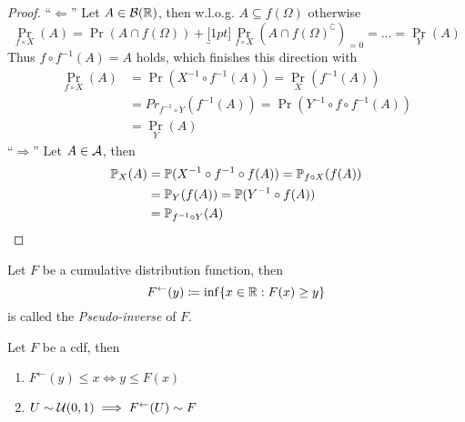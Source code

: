 \begin{proof}
    ``\(\Leftarrow\)'' Let \(A\in\cB(\R)\), then w.l.o.g. \(A\subseteq f(\Omega)\) otherwise
    \[
        \Pr_{f\circ X}(A)=\Pr(A\cap f(\Omega))+\underbracket[1pt]{
            \Pr_{f\circ X}(A\cap f(\Omega)^\complement)
            }_{=0}=\dotsc=\Pr_Y(A) 
    \]
    Thus \(f\circ f^{-1}(A)=A\) holds, which finishes this direction with
    \begin{align*}
        \Pr_{f\circ X}(A)
        &=\Pr(X^{-1}\circ f^{-1}(A))=\Pr_X(f^{-1}(A))\\
        &=Pr_{f^{-1}\circ Y}(f^{-1}(A))=\Pr(Y^{-1}\circ f\circ f^{-1}(A))\\
        &=\Pr_Y(A)
    \end{align*}
    ``\(\Rightarrow\)'' Let \(A\in\cA\), then
    \begin{align*}
        \Pr_X(A)&=\Pr(X^{-1}\circ f^{-1}\circ f(A))=\Pr_{f\circ X}(f(A))\\
        &=\Pr_Y(f(A))=\Pr(Y^{-1}\circ f(A))\\
        &=\Pr_{f^{-1}\circ Y}(A) \qedhere
    \end{align*}
\end{proof}
\begin{definition}\label{appx3}
    Let \(F\) be a cumulative distribution function, then 
    \[F^\leftarrow (y) \coloneqq \inf\{x\in\R : F(x)\ge y \}\]
    is called the \emph{Pseudo-inverse} of \(F\).
\end{definition}
\begin{lemma}\label{appx pseudo inv distribution}
    Let \(F\) be a cdf, then
    \begin{enumerate}[label=(\roman*), font=\normalfont]
        \item\label{appx3:i} \(
            F^\leftarrow (y)\le x \iff y \le F(x)
        \)
        \item\label{appx3:ii} \(U\sim\cU(0,1) \implies F^\leftarrow(U) \sim F \)
    \end{enumerate}
\end{lemma}
